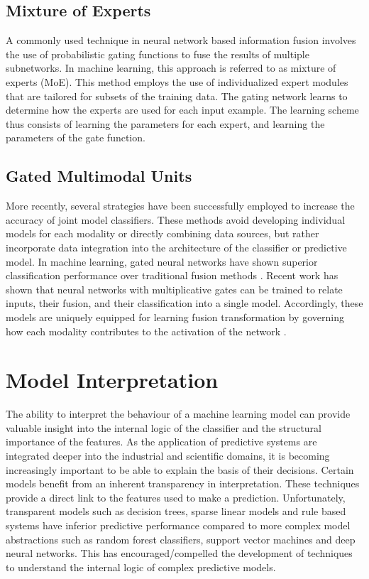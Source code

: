 \subsection{Mixture of Experts}
A commonly used technique in neural network based information fusion involves the use of probabilistic gating functions to fuse the results of multiple subnetworks. In machine learning, this approach is referred to as mixture of experts (MoE). This method employs the use of individualized expert modules that are tailored for subsets of the training data. The gating network learns to determine how the experts are used for each input example. The learning scheme thus consists of learning the parameters for each expert, and learning the parameters of the gate function.



\subsection{Gated Multimodal Units}

More recently, several strategies have been successfully employed to increase the accuracy of joint model classifiers. These methods avoid developing individual models for each modality or directly combining data sources, but rather incorporate data integration into the architecture of the classifier or predictive model. In machine learning, gated neural networks have shown superior classification performance over traditional fusion methods \cite{arevalo2017gated,bai2018integrating}. Recent work has shown that neural networks with multiplicative gates can be trained to relate inputs, their fusion, and their classification into a single model. Accordingly, these models are uniquely equipped for learning fusion transformation by governing how each modality contributes to the activation of the network \cite{arevalo2017gated}. 

\section{Model Interpretation}


The ability to interpret the behaviour of a machine learning model can provide valuable insight into the internal logic of the classifier and the structural importance of the features. As the application of predictive systems are integrated deeper into the industrial and scientific domains, it is becoming increasingly important to be able to explain the basis of their decisions. Certain models benefit from an inherent transparency in interpretation. These techniques provide a direct link to the features used to make a prediction. Unfortunately, transparent models such as decision trees, sparse linear models and rule based systems have inferior predictive performance compared to more complex model abstractions such as random forest classifiers, support vector machines and deep neural networks. This has encouraged/compelled the development of techniques to understand the internal logic of complex predictive models. 

